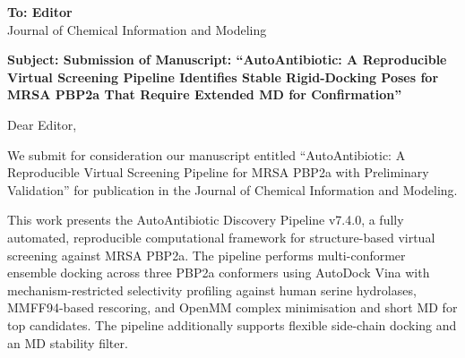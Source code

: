 \documentclass[12pt]{article}
\begin{document}
\begin{flushright}
\textbf{To: Editor}\\
Journal of Chemical Information and Modeling\\
\end{flushright}

\vspace{1em}

\textbf{Subject: Submission of Manuscript: ``AutoAntibiotic: A Reproducible Virtual Screening Pipeline Identifies Stable Rigid-Docking Poses for MRSA PBP2a That Require Extended MD for Confirmation''}

\vspace{1em}

Dear Editor,

We submit for consideration our manuscript entitled ``AutoAntibiotic: A Reproducible Virtual Screening Pipeline for MRSA PBP2a with Preliminary Validation'' for publication in the Journal of Chemical Information and Modeling.

This work presents the AutoAntibiotic Discovery Pipeline v7.4.0, a fully automated, reproducible computational framework for structure-based virtual screening against MRSA PBP2a. The pipeline performs multi-conformer ensemble docking across three PBP2a conformers using AutoDock Vina with mechanism-restricted selectivity profiling against human serine hydrolases, MMFF94-based rescoring, and OpenMM complex minimisation and short MD for top candidates. The pipeline additionally supports flexible side-chain docking and an MD stability filter.
\end{document}
